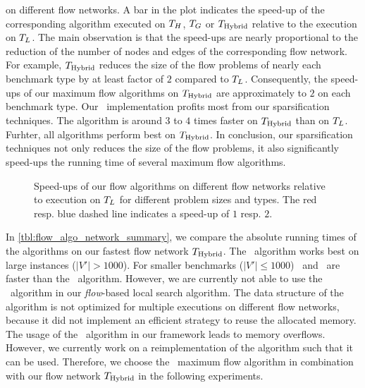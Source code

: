 on different flow networks. A bar in the plot indicates the speed-up of the corresponding algorithm
executed on $T_H$, $T_G$ or $T_{\text{Hybrid}}$ relative to the execution on $T_L$.
The main observation is that the speed-ups are nearly proportional to the reduction of the number
of nodes and edges of the corresponding flow network. For example, $T_{\text{Hybrid}}$ reduces the size
of the flow problems of nearly each benchmark type by at least factor of $2$ compared to $T_L$. Consequently,
the speed-ups of our maximum flow algorithms on $T_{\text{Hybrid}}$ are approximately to $2$ on each
benchmark type. Our \GoldbergTarjan~implementation profits most from our sparsification 
techniques. The algorithm is around $3$ to $4$ times faster on $T_{\text{Hybrid}}$ than on 
$T_L$. Furhter, all algorithms perform best on $T_{\text{Hybrid}}$. In conclusion, our
sparsification techniques not only reduces the size of the flow problems, it also significantly
speed-ups the running time of several maximum flow algorithms.\\
\begin{figure}
\centering
\caption{Speed-ups of our flow algorithms on different flow networks relative to execution on
         $T_L$ for different problem sizes and types. The red resp. blue dashed line 
         indicates a speed-up of $1$ resp. $2$.}
\label{fig:max_flow_network_algo}
\end{figure} 
In \autoref{tbl:flow_algo_network_summary}, we compare the absolute running times of the 
algorithms on our fastest flow network $T_{\text{Hybrid}}$. The \IBFS~algorithm works best on
large instances ($|V'| > 1000$). For smaller benchmarks ($|V'| \le 1000$) 
\BoykovKolmogorov~and \EdmondKarp~are faster than the \IBFS~algorithm. 
However, we are currently not able to use the \IBFS~algorithm
in our \emph{flow}-based local search algorithm. The data structure of the algorithm
is not optimized for multiple executions on different flow networks, because it did not 
implement an efficient strategy to reuse the allocated memory. The usage of the \IBFS~algorithm in our
framework leads to memory overflows. However, we currently work on a reimplementation
of the algorithm such that it can be used. Therefore, we choose the \BoykovKolmogorov~maximum 
flow algorithm in combination with our flow network $T_{\text{Hybrid}}$ in the following experiments.
